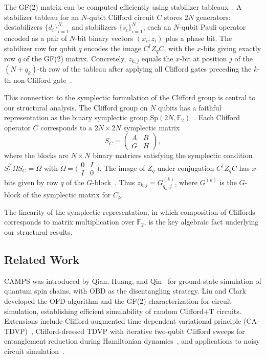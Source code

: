 \documentclass[a4paper,twocolumn,11pt]{quantumarticle}
\begin{document}
The GF(2) matrix can be computed efficiently using stabilizer tableaux~\cite{Aaronson2004}.
A stabilizer tableau for an $N$-qubit Clifford circuit $C$ stores $2N$ generators: destabilizers $\{d_i\}_{i=1}^N$ and stabilizers $\{s_i\}_{i=1}^N$, each an $N$-qubit Pauli operator encoded as a pair of $N$-bit binary vectors $(x_i, z_i)$ plus a phase bit.
The stabilizer row for qubit $q$ encodes the image $C^\dagger Z_q C$, with the $x$-bits giving exactly row $q$ of the GF(2) matrix.
Concretely, $z_{k,j}$ equals the $x$-bit at position $j$ of the $(N+q_k)$-th row of the tableau after applying all Clifford gates preceding the $k$-th non-Clifford gate~\cite{Dehaene2003}.

This connection to the symplectic formulation of the Clifford group is central to our structural analysis.
The Clifford group on $N$ qubits has a faithful representation as the binary symplectic group $\mathrm{Sp}(2N, \mathbb{F}_2)$~\cite{Dehaene2003}.
Each Clifford operator $C$ corresponds to a $2N \times 2N$ symplectic matrix
\begin{equation}
\label{eq:symplectic}
S_C = \begin{pmatrix} A & B \\ G & H \end{pmatrix},
\end{equation}
where the blocks are $N \times N$ binary matrices satisfying the symplectic condition $S_C^T \Omega S_C = \Omega$ with $\Omega = \bigl(\begin{smallmatrix} 0 & I \\ I & 0 \end{smallmatrix}\bigr)$.
The image of $Z_{q}$ under conjugation $C^\dagger Z_q C$ has $x$-bits given by row $q$ of the $G$-block~\cite{Dehaene2003}.
Thus $z_{k,j} = G^{(k)}_{q_k,j}$, where $G^{(k)}$ is the $G$-block of the symplectic matrix for $C_k$.

The linearity of the symplectic representation, in which composition of Cliffords corresponds to matrix multiplication over $\mathbb{F}_2$, is the key algebraic fact underlying our structural results.

\subsection{Related Work}

CAMPS was introduced by Qian, Huang, and Qin~\cite{Qian2024} for ground-state simulation of quantum spin chains, with OBD as the disentangling strategy.
Liu and Clark~\cite{Liu2024} developed the OFD algorithm and the GF(2) characterization for circuit simulation, establishing efficient simulability of random Clifford+T circuits.
Extensions include Clifford-augmented time-dependent variational principle (CA-TDVP)~\cite{Qian2024b}, Clifford-dressed TDVP with iterative two-qubit Clifford sweeps for entanglement reduction during Hamiltonian dynamics~\cite{MelloTDVP2025}, and applications to noisy circuit simulation~\cite{Mello2024}.
\end{document}
